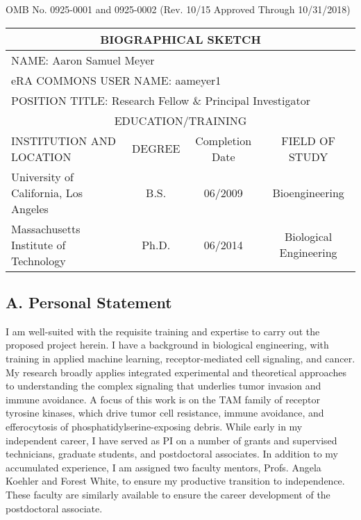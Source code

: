 \documentclass[11pt]{article}
\begin{document}
\setlength\parindent{0pt}

\renewcommand{\arraystretch}{1.2}

\begin{flushright}
\footnotesize
	OMB No. 0925-0001 and 0925-0002 (Rev. 10/15 Approved Through 10/31/2018)
\end{flushright}


\begin{tabular}{l|c|c|c}
  \hline
  \multicolumn{4}{c}{\textbf{BIOGRAPHICAL SKETCH}} \\
  \hline
  \multicolumn{4}{l}{NAME: Aaron Samuel Meyer} \\
  \hline
  \multicolumn{4}{l}{eRA COMMONS USER NAME: aameyer1} \\
  \hline
  \multicolumn{4}{l}{POSITION TITLE: Research Fellow \& Principal Investigator} \\
  \hline
  \multicolumn{4}{c}{EDUCATION/TRAINING} \\
  \hline
  INSTITUTION AND LOCATION & DEGREE & Completion Date & FIELD OF STUDY \\
  \hline
  University of California, Los Angeles & B.S. & 06/2009 & Bioengineering \\
  Massachusetts Institute of Technology & Ph.D. & 06/2014 & Biological Engineering \\
  
\end{tabular}


\vspace{20pt}

\subsection{A. Personal Statement}


I am well-suited with the requisite training and expertise to carry out the proposed project herein. I have a background in biological engineering, with training in applied machine learning, receptor-mediated cell signaling, and cancer. My research broadly applies integrated experimental and theoretical approaches to understanding the complex signaling that underlies tumor invasion and immune avoidance. A focus of this work is on the TAM family of receptor tyrosine kinases, which drive tumor cell resistance, immune avoidance, and efferocytosis of phosphatidylserine-exposing debris. While early in my independent career, I have served as PI on a number of grants and supervised technicians, graduate students, and postdoctoral associates. In addition to my accumulated experience, I am assigned two faculty mentors, Profs. Angela Koehler and Forest White, to ensure my productive transition to independence. These faculty are similarly available to ensure the career development of the postdoctoral associate.
\end{document}
